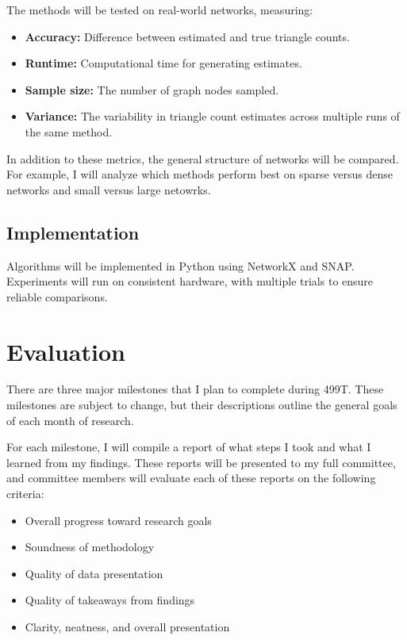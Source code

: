\documentclass[11pt]{article}
\begin{document}
The methods will be tested on real-world networks, measuring:

\begin{itemize}
    \item \textbf{Accuracy:} Difference between estimated and true triangle counts.
    \item \textbf{Runtime:} Computational time for generating estimates.
    \item \textbf{Sample size:} The number of graph nodes sampled.
    \item \textbf{Variance:} The variability in triangle count estimates across multiple runs of the same method.
\end{itemize}

In addition to these metrics, the general structure of networks will be compared.
For example, I will analyze which methods perform best on sparse versus dense networks and small versus large netowrks.

\subsection{Implementation}

Algorithms will be implemented in Python using NetworkX and SNAP.
Experiments will run on consistent hardware, with multiple trials to ensure reliable comparisons.

\section{Evaluation}

There are three major milestones that I plan to complete during 499T.
These milestones are subject to change, but their descriptions outline the general goals of each month of research.

For each milestone, I will compile a report of what steps I took and what I learned from my findings.
These reports will be presented to my full committee, and committee members will evaluate each of these reports on the following criteria:

\begin{itemize}
    \item Overall progress toward research goals
    \item Soundness of methodology
    \item Quality of data presentation
    \item Quality of takeaways from findings
    \item Clarity, neatness, and overall presentation
\end{itemize}
\end{document}
